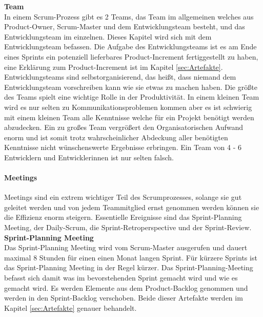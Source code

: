 			\textbf{Team} \\
			In einem Scrum-Prozess gibt es 2 Teams, das Team im allgemeinen welches aus Product-Owner, Scrum-Master und dem Entwicklungsteam besteht, und das Entwicklungsteam im einzelnen. Dieses Kapitel wird sich mit dem Entwicklungsteam befassen. Die Aufgabe des Entwicklungsteams ist es am Ende eines Sprints ein potenziell lieferbares Product-Increment fertiggestellt zu haben, eine Erklärung zum Product-Increment ist im Kapitel \ref{sec:Artefakte}. Entwicklungsteams sind selbstorganisierend, das heißt, dass niemand dem Entwicklungsteam vorschreiben kann wie sie etwas zu machen haben.
			Die größte des Teams spielt eine wichtige Rolle in der Produktivität. In einem kleinen Team wird es nur selten zu Kommunikationsproblemen kommen aber es ist schwierig mit einem kleinen Team alle Kenntnisse welche für ein Projekt benötigt werden abzudecken. Ein zu großes Team vergrößert den Organisatorischen Aufwand enorm und ist somit trotz wahrscheinlicher Abdeckung aller benötigten Kenntnisse nicht wünschenswerte Ergebnisse erbringen. Ein Team von 4 - 6 Entwicklern und Entwicklerinnen ist nur selten falsch. \textcite{ScrumTeam} \\
			
		
	\paragraph{Meetings}
	\label{sec:Meetings}
		Meetings sind ein extrem wichtiger Teil des Scrumprozesses, solange sie gut geleitet werden und von jedem Teammitglied ernst genommen werden können sie die Effizienz enorm steigern. Essentielle Ereignisse sind das Sprint-Planning Meeting, der Daily-Scrum, die Sprint-Retroperspective und der Sprint-Review.  \\
		
		\textbf{Sprint-Planning Meeting} \\
		Das Sprint-Planning Meeting wird vom Scrum-Master ausgerufen und dauert maximal 8 Stunden für einen einen Monat langen Sprint. Für kürzere Sprints ist das Sprint-Planning Meeting in der Regel kürzer. Das Sprint-Planning-Meeting befasst sich damit was im bevorstehenden Sprint gemacht wird und wie es gemacht wird. Es werden Elemente aus dem Product-Backlog genommen und werden in den Sprint-Backlog verschoben. Beide dieser Artefakte werden im Kapitel \ref{sec:Artefakte} genauer behandelt. \textcite{ScrumSprint-Planning} \\
		
